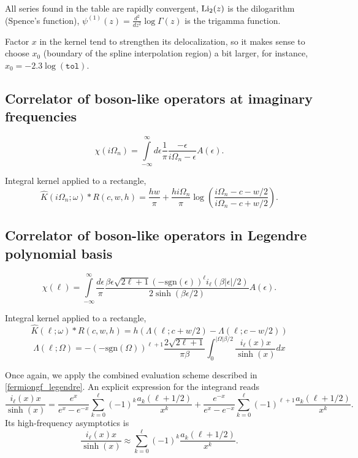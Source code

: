 \documentclass[]{article}
\begin{document}
All series found in the table are rapidly convergent, $\mathrm{Li}_2(z)$ is the dilogarithm (Spence's function),
$\psi^{(1)}(z) = \frac{d^2}{dz^2}\log\Gamma(z)$ is the trigamma function.

Factor $x$ in the kernel tend to strengthen its delocalization, so
it makes sense to choose $x_0$ (boundary of the spline interpolation region)
a bit larger, for instance, $x_0=-2.3\log(\mathtt{tol})$.

\subsection{Correlator of boson-like operators at imaginary frequencies}
\label{bosoncorr_imfreq}
\begin{equation}
\chi(i\Omega_n) = \int\limits_{-\infty}^\infty
d\epsilon \frac{1}{\pi}\frac{-\epsilon}{i\Omega_n-\epsilon} A(\epsilon).
\end{equation}

Integral kernel applied to a rectangle,
\begin{equation}
\hat K(i\Omega_n;\omega)*R(c,w,h) =
\frac{hw}{\pi} + \frac{hi\Omega_n}{\pi}\log\left(\frac{i\Omega_n - c - w/2}{i\Omega_n - c + w/2}\right).
\end{equation}

\subsection{Correlator of boson-like operators in Legendre polynomial basis}
\label{bosoncorr_legendre}
\begin{equation}
	\chi(\ell) = \int\limits_{-\infty}^\infty
	\frac{d\epsilon}{\pi}
	\frac{\beta\epsilon\sqrt{2\ell+1}(-\mathrm{sgn}(\epsilon))^\ell i_{\ell}(\beta|\epsilon|/2)}
	{2\sinh(\beta\epsilon/2)} A(\epsilon).
\end{equation}

Integral kernel applied to a rectangle,
\begin{equation}
	\hat K(\ell;\omega)*R(c,w,h) = h (\Lambda(\ell;c+w/2) - \Lambda(\ell;c-w/2))
\end{equation}
\begin{equation}
	\Lambda(\ell;\Omega) = -(-\mathrm{sgn}(\Omega))^{\ell+1}
	\frac{2\sqrt{2\ell+1}}{\pi\beta}
	\int_0^{|\Omega|\beta/2} \frac{i_\ell(x) x}{\sinh(x)} dx
\end{equation}

Once again, we apply the combined evaluation scheme described in
\ref{fermiongf_legendre}. An explicit expression for the integrand reads
\begin{equation}\label{il_x_sinh_series}
	\frac{i_\ell(x) x}{\sinh(x)} =
	\frac{e^x}{e^x-e^{-x}}\sum_{k=0}^\ell(-1)^k
	\frac{a_k(\ell+1/2)}{x^k} +
	\frac{e^{-x}}{e^x-e^{-x}}\sum_{k=0}^\ell(-1)^{\ell+1}
	\frac{a_k(\ell+1/2)}{x^k}.
\end{equation}
Its high-frequency asymptotics is
\begin{equation}
	\frac{i_\ell(x) x}{\sinh(x)} \approx
		\sum_{k=0}^\ell(-1)^k \frac{a_k(\ell+1/2)}{x^k}.
\end{equation}
\end{document}
